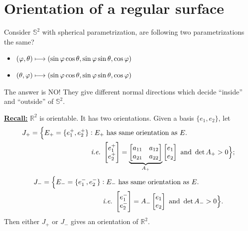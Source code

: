 \section{Orientation of a regular surface}
\begin{question}
    Consider \(\mathbb{S}^2\) with spherical parametrization, are following two
    parametrizations the same?
    \begin{itemize}
        \item \((\varphi,\theta)\longmapsto(\sin\varphi\cos\theta,\sin\varphi\sin\theta,
            \cos\varphi)\)
        \item \((\theta,\varphi)\longmapsto(\sin\varphi\cos\theta,\sin\varphi\sin\theta,
            \cos\varphi)\)
    \end{itemize}
\end{question}

The answer is NO\@! They give different normal directions which decide ``inside'' and
``outside'' of \(\mathbb{S}^2\).

\noindent\underline{\bfseries Recall:} \(\mathbb{R}^2\) is orientable. It has two
orientations. Given a basis \(\{e_1,e_2\}\), let
\begin{align*}
    J_{+}=\Bigl\{E_{+}=\{e_1^+,e_2^+\}&:E_{+}\text{ has same orientation as }E.\\
    &\text{ \emph{i.e.}\ }\begin{bmatrix}
        e_1^+\\ e_2^+
    \end{bmatrix}=\underbrace{\begin{bmatrix}
        a_{11} & a_{12} \\
        a_{21} & a_{22}
    \end{bmatrix}}_{A_{+}}\begin{bmatrix}
        e_1 \\ e_2
    \end{bmatrix}
    \text{ and }\det A_{+}>0\Bigr\};
\end{align*}
\begin{align*}
    J_{-}=\Bigl\{E_{-}=\{e_1^-,e_2^-\}&:E_{-}\text{ has same orientation as }E.\\
    &\text{ \emph{i.e.}\ }\begin{bmatrix}
        e_1^-\\ e_2^-
    \end{bmatrix}
    =A_{-}\begin{bmatrix}
        e_1 \\ e_2
    \end{bmatrix}
    \text{ and }\det A_{-}>0\Bigr\}.
\end{align*}
Then either \(J_{+}\) or \(J_{-}\) gives an orientation of \(\mathbb{R}^2\).

